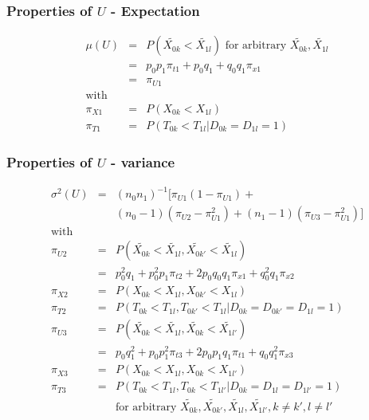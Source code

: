 \documentclass[xcolor=pdftex,dvipsnames,table]{beamer}\usepackage[]{graphicx}\usepackage[]{color}
\begin{document}
\begin{frame} %
\frametitle{Properties of $U$ - Expectation}
\begin{eqnarray*}
  \mu(U) & = & P(\tilde{X_{0k}} < \tilde{X_{1l}})  \mbox{ for arbitrary } \tilde{X_{0k}}, \tilde{X_{1l}} \\
         & = & p_0 p_1 \pi_{t1} + p_0 q_1 + q_0 q_1 \pi_{x1} \\
         & = & \pi_{U1}\\
  \mbox{with}   &   & \\
  \pi_{X1} & = & P(X_{0k} < X_{1l}) \\
  \pi_{T1} & = & P(T_{0k} < T_{1l} | D_{0k} = D_{1l} = 1)
\end{eqnarray*}
\end{frame}

\begin{frame} %
\frametitle{Properties of $U$ - variance}
\begin{eqnarray*}
\sigma^2(U) & = & (n_0 n_1)^{-1} \big[ \pi_{U1} (1 - \pi_{U1}) + \\
            &   &                 (n_0 - 1) (\pi_{U2} - \pi_{U1}^2) + 
                                  (n_1 - 1) (\pi_{U3} - \pi_{U1}^2) \big] \\
  \mbox{with} &   & \\
  \pi_{U2} & = & P(\tilde{X_{0k}} < \tilde{X_{1l}}, \tilde{X_{0k'}} < \tilde{X_{1l}}) \\
           & = & p_0^2 q_1 + p_0^2 p_1 \pi_{t2} + 2 p_0 q_0 q_1 \pi_{x1} + q_0^2 q_1 \pi_{x2} \\
  \pi_{X2} & = & P(X_{0k} < X_{1l}, X_{0k'} < X_{1l}) \\
  \pi_{T2} & = & P(T_{0k} < T_{1l}, T_{0k'} < T_{1l} | D_{0k} = D_{0k'} = D_{1l} = 1) \\
  \pi_{U3} & = & P(\tilde{X_{0k}} < \tilde{X_{1l}}, \tilde{X_{0k}} < \tilde{X_{1l'}}) \\
           & = & p_0 q_1^2 + p_0 p_1^2 \pi_{t3} + 2 p_0 p_1 q_1 \pi_{t1} + q_0 q_1^2 \pi_{x3} \\
  \pi_{X3} & = & P(X_{0k} < X_{1l}, X_{0k} < X_{1l'}) \\
  \pi_{T3} & = & P(T_{0k} < T_{1l}, T_{0k} < T_{1l'} | D_{0k} = D_{1l} = D_{1l'} =1)\\
           &   & \mbox{for arbitrary } \tilde{X_{0k}}, \tilde{X_{0k'}}, \tilde{X_{1l}}, 
                                      \tilde{X_{1l'}}, k \ne k', l \ne l'
\end{eqnarray*}
\end{frame}
\end{document}
